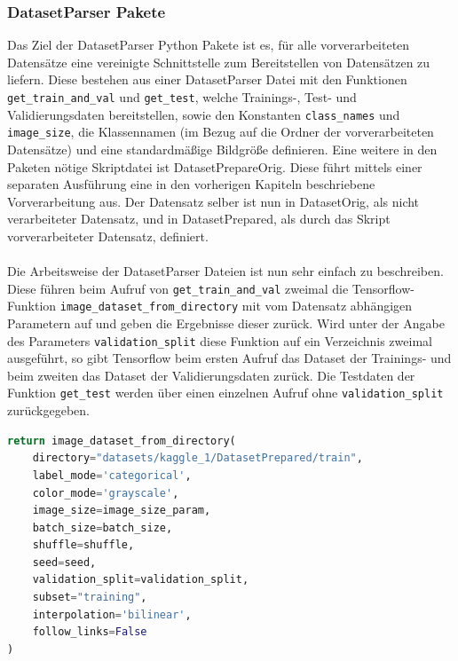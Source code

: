 \documentclass[11pt,bibliography=totocnumbered]{scrartcl}
\begin{document}
\subsubsection{DatasetParser Pakete}
Das Ziel der DatasetParser Python Pakete ist es, für alle vorverarbeiteten Datensätze eine vereinigte Schnittstelle zum Bereitstellen von Datensätzen zu liefern. Diese bestehen aus einer DatasetParser Datei mit den Funktionen \lstinline[language=pythoninline]|get_train_and_val| und \lstinline[language=pythoninline]|get_test|, welche Trainings-, Test- und Validierungsdaten bereitstellen, sowie den Konstanten \lstinline[language=pythoninline]|class_names| und \lstinline[language=pythoninline]|image_size|, die Klassennamen (im Bezug auf die Ordner der vorverarbeiteten Datensätze) und eine standardmäßige Bildgröße definieren. Eine weitere in den Paketen nötige Skriptdatei ist DatasetPrepareOrig. Diese führt mittels einer separaten Ausführung eine in den vorherigen Kapiteln beschriebene Vorverarbeitung aus. Der Datensatz selber ist nun in DatasetOrig, als nicht verarbeiteter Datensatz, und in DatasetPrepared, als durch das Skript vorverarbeiteter Datensatz, definiert.
\\\\
Die Arbeitsweise der DatasetParser Dateien ist nun sehr einfach zu beschreiben. Diese führen beim Aufruf von \lstinline[language=pythoninline]|get_train_and_val| zweimal die Tensorflow-Funktion \lstinline[language=pythoninline]|image_dataset_from_directory| mit vom Datensatz abhängigen Parametern auf und geben die Ergebnisse dieser zurück. Wird unter der Angabe des Parameters \lstinline[language=pythoninline]|validation_split| diese Funktion auf ein Verzeichnis zweimal ausgeführt, so gibt Tensorflow beim ersten Aufruf das Dataset der Trainings- und beim zweiten das Dataset der Validierungsdaten zurück. Die Testdaten der Funktion \lstinline[language=pythoninline]|get_test| werden über einen einzelnen Aufruf ohne \lstinline[language=pythoninline]|validation_split| zurückgegeben.
\begin{lstlisting}[language=python,firstnumber=1,caption={Beispielhafter Aufruf der Funktion zum Einlesen von Daten},label=lst:dataset]
return image_dataset_from_directory(
	directory="datasets/kaggle_1/DatasetPrepared/train",
	label_mode='categorical',
	color_mode='grayscale',
	image_size=image_size_param,
	batch_size=batch_size,
	shuffle=shuffle,
	seed=seed,
	validation_split=validation_split,
	subset="training",
	interpolation='bilinear',
	follow_links=False
)
\end{lstlisting}
\end{document}
